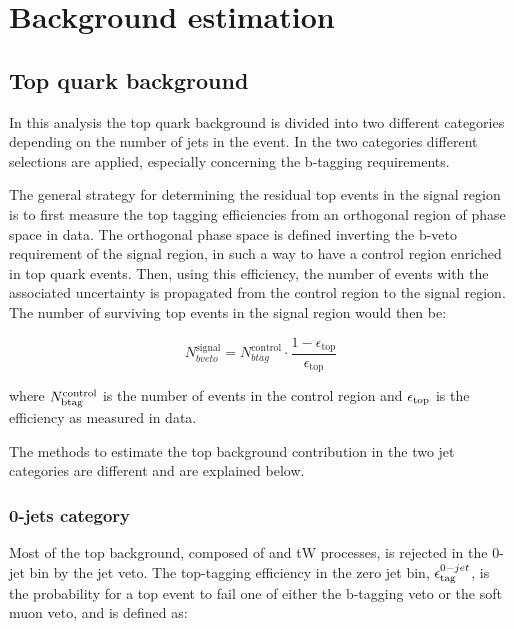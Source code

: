 \section{Background estimation}
\label{sec:Backgrounds}


\subsection{Top quark background \label{sec:TTBackground}}

In this analysis the top quark background is divided into two different categories depending on the number of jets in the event. In the two categories different selections are applied, especially concerning the b-tagging requirements.

The general strategy for determining the residual top events in the signal region is to first measure the top tagging efficiencies from an orthogonal region of phase space in data. The orthogonal phase space is  defined inverting the b-veto requirement of the signal region, in such a way to have a control region enriched in top quark events.  Then, using this efficiency, the number of events with the associated uncertainty is propagated from the control region to the signal region.
The number of surviving top events in the signal region would then be:

\begin{equation}
 N^{\mathrm{signal}}_{bveto} = N^{\mathrm{control}}_{btag} \cdot \frac{1-\epsilon_{\mathrm{top}}}{\epsilon_{\mathrm{top}}}
\label{eq:top_equation}
\end{equation}

where $N^{\rm control}_{\rm btag}$ is the number of events in the 
control region and $\epsilon_{\rm top}$ is the efficiency as measured
in data.

The methods to estimate the top background contribution in the two jet categories are different and are explained below.


\subsubsection{0-jets category}
Most of the top background, composed of \ttbar and tW processes, is rejected in the 0-jet bin by the
jet veto. The top-tagging efficiency in the zero jet bin, $\epsilon_{\rm tag}^{0-jet}$, is the probability for a top event to
fail one of either the b-tagging veto or the soft muon veto, and is defined as:

